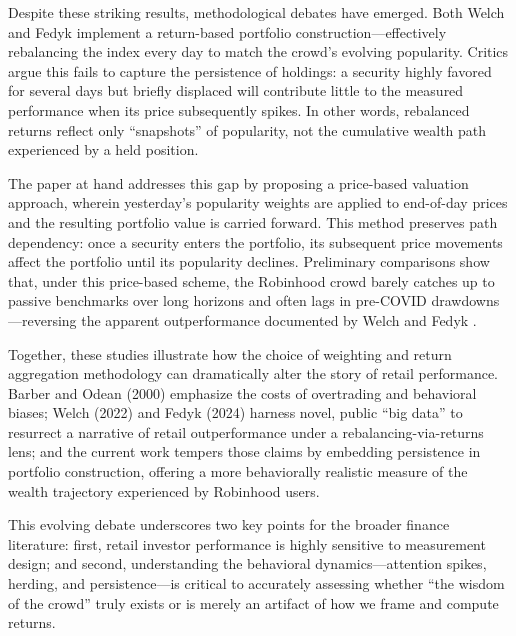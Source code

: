 Despite these striking results, methodological debates have emerged. 
Both Welch and Fedyk implement a return-based portfolio construction—effectively rebalancing the index every day to match the crowd's evolving popularity.
Critics argue this fails to capture the persistence of holdings: a security highly favored for several days but briefly displaced will contribute little to the measured performance when its price subsequently spikes. 
In other words, rebalanced returns reflect only “snapshots” of popularity, not the cumulative wealth path experienced by a held position.

The paper at hand addresses this gap by proposing a price-based valuation approach, wherein yesterday's popularity weights are applied to end-of-day prices and the resulting portfolio value is carried forward. 
This method preserves path dependency: once a security enters the portfolio, its subsequent price movements affect the portfolio until its popularity declines. 
Preliminary comparisons show that, under this price-based scheme, the Robinhood crowd barely catches up to passive benchmarks over long horizons and often lags in pre-COVID drawdowns—reversing the apparent outperformance documented by Welch and Fedyk .

Together, these studies illustrate how the choice of weighting and return aggregation methodology can dramatically alter the story of retail performance. 
Barber and Odean (2000) emphasize the costs of overtrading and behavioral biases; Welch (2022) and Fedyk (2024) harness novel, public “big data” to resurrect a narrative of retail outperformance under a rebalancing-via-returns lens; and the current work tempers those claims by embedding persistence in portfolio construction, offering a more behaviorally realistic measure of the wealth trajectory experienced by Robinhood users.

This evolving debate underscores two key points for the broader finance literature: first, retail investor performance is highly sensitive to measurement design; and second, understanding the behavioral dynamics—attention spikes, herding, and persistence—is critical to accurately assessing whether “the wisdom of the crowd” truly exists or is merely an artifact of how we frame and compute returns.
